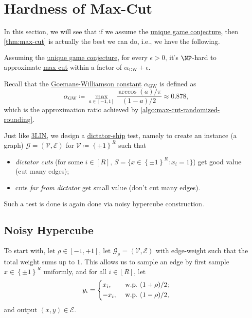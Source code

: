 \section{Hardness of Max-Cut}
In this section, we will see that if we assume the \hyperref[conj:unique-game]{unique game conjecture}, then \autoref{thm:max-cut} is actually the best we can do, i.e., we have the following.

\begin{theorem}\label{thm:max-cut-hardness}
	Assuming the \hyperref[conj:unique-game]{unique game conjecture}, for every \(\epsilon > 0 \), it's \(\NP\)-hard to approximate \hyperref[prb:max-cut]{max cut}  within a factor of \(\alpha _{\mathrm{GW} }+\epsilon \).
\end{theorem}

\begin{prev}
	Recall that the \hyperref[not:GW]{Goemans-Williamson constant} \(\alpha _{\mathrm{GW} }\) is defined as
	\[
		\alpha _{\mathrm{GW} } \coloneqq \max _{a\in [-1, 1]}\frac{\arccos (a) / \pi }{(1 - a) / 2} \approx 0.878,
	\]
	which is the approximation ratio achieved by \autoref{algo:max-cut-randomized-rounding}.
\end{prev}

Just like \hyperref[prb:max-3LIN]{3LIN}, we design a \hyperref[def:dictation]{dictator-ship} test, namely to create an instance (a graph) \(\mathcal{G} =(\mathcal{V} , \mathcal{E} )\) for \(\mathcal{V} \coloneqq \left\{ \pm 1 \right\} ^R\) such that
\begin{itemize}
	\item \emph{dictator cuts} (for some \(i\in [R]\), \(S = \{ x\in \left\{ \pm 1 \right\} ^R \colon x_i = 1 \} \)) get good value (cut many edges);
	\item cuts \emph{far from dictator} get small value (don't cut many edges).
\end{itemize}

Such a test is done is again done via noisy hypercube construction.

\subsection{Noisy Hypercube}\label{subsec:noisy-hypercube}
To start with, let \(\rho \in [-1, +1]\), let \(\mathcal{G} _{\rho} = (\mathcal{V} , \mathcal{E} )\) with edge-weight such that the total weight sums up to \(1\). This allows us to sample an edge by first sample \(x\in \left\{ \pm 1 \right\} ^R\) uniformly, and for all \(i\in [R]\), let
\[
	y_i = \begin{dcases}
		x_i,  & \text{ w.p.\ } (1 + \rho ) / 2 ; \\
		-x_i, & \text{ w.p.\ } (1 - \rho ) / 2,
	\end{dcases}
\]
and output \((x, y)\in \mathcal{E} \).

